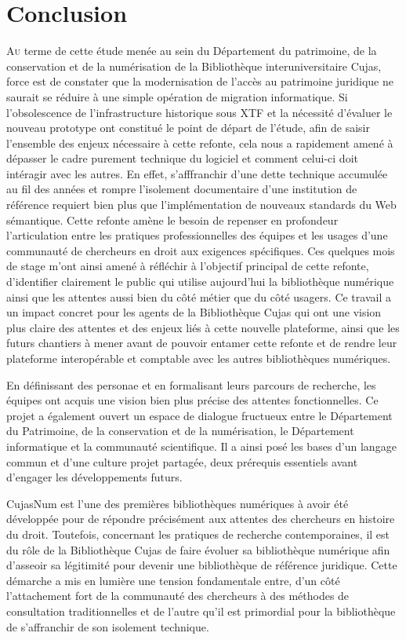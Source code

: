 \chapter*{Conclusion}

\lettrine{A}u terme de cette étude menée au sein du Département du patrimoine, de la conservation et de la numérisation de la Bibliothèque interuniversitaire Cujas, force est de constater que la modernisation de l'accès au patrimoine juridique ne saurait se réduire à une simple opération de migration informatique. Si l'obsolescence de l'infrastructure historique sous \ac{XTF} et la nécessité d'évaluer le nouveau prototype ont constitué le point de départ de l'étude, afin de saisir l'ensemble des enjeux nécessaire à cette refonte, cela nous a rapidement amené à dépasser le cadre purement technique du logiciel et comment celui-ci doit intéragir avec les autres. En effet, s'afffranchir d'une dette technique accumulée au fil des années et rompre l'isolement documentaire d'une institution de référence requiert bien plus que l'implémentation de nouveaux standards du Web sémantique. Cette refonte amène le besoin de repenser en profondeur l'articulation entre les pratiques professionnelles des équipes et les usages d'une communauté de chercheurs en droit aux exigences spécifiques. Ces quelques mois de stage m'ont ainsi amené à réfléchir à l'objectif principal de cette refonte, d'identifier clairement le public qui utilise aujourd'hui la bibliothèque numérique ainsi que les attentes aussi bien du côté métier que du côté usagers. Ce travail a un impact concret pour les agents de la Bibliothèque Cujas qui ont une vision plus claire des attentes et des enjeux liés à cette nouvelle plateforme, ainsi que les futurs chantiers à mener avant de pouvoir entamer cette refonte et de rendre leur plateforme interopérable et comptable avec les autres bibliothèques numériques.

En définissant des personae et en formalisant leurs parcours de recherche, les équipes ont acquis une vision bien plus précise des attentes fonctionnelles. Ce projet a également ouvert un espace de dialogue fructueux entre le Département du Patrimoine, de la conservation et de la numérisation, le Département informatique et la communauté scientifique. Il a ainsi posé les bases d'un langage commun et d'une culture projet partagée, deux prérequis essentiels avant d'engager les développements futurs.

CujasNum est l'une des premières bibliothèques numériques à avoir été développée pour de répondre précisément aux attentes des chercheurs en histoire du droit. Toutefois, concernant les pratiques de recherche contemporaines, il est du rôle de la Bibliothèque Cujas de faire évoluer sa bibliothèque numérique afin d'asseoir sa légitimité pour devenir une bibliothèque de référence juridique. Cette démarche a mis en lumière une tension fondamentale entre, d'un côté l'attachement fort de la communauté des chercheurs à des méthodes de consultation traditionnelles et de l'autre qu'il est primordial pour la bibliothèque de s'affranchir de son isolement technique.

